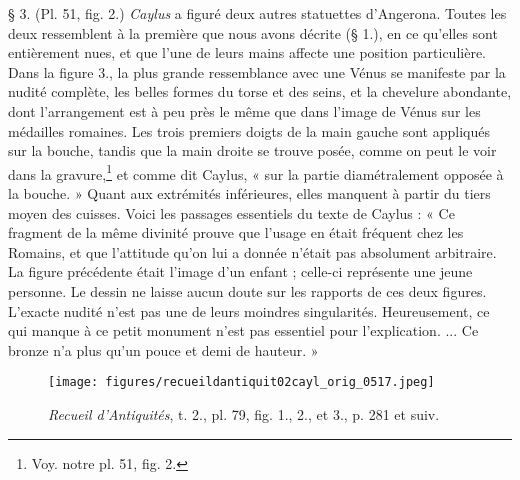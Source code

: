 \documentclass[a4paper, 11pt, oneside, polutonikogreek, french]{article}
\begin{document}
§ 3. (Pl. 51, fig. 2.) \emph{Caylus} a figuré deux autres statuettes d'Angerona. Toutes les deux ressemblent à la première que nous avons décrite (§ 1.), en ce qu'elles sont entièrement nues, et que l'une de leurs mains affecte une position particulière. Dans la figure 3., la plus grande ressemblance avec une Vénus se manifeste par la nudité complète, les belles formes du torse et des seins, et la chevelure abondante, dont l'arrangement est à peu près le même que dans l'image de Vénus sur les médailles romaines. Les trois premiers doigts de la main gauche sont appliqués sur la bouche, tandis que la main droite se trouve posée, comme on peut le voir dans la gravure,\footnote{Voy. notre pl. 51, fig. 2.} et comme dit Caylus, « sur la partie diamétralement opposée à la bouche. » Quant aux extrémités inférieures, elles manquent à partir du tiers moyen des cuisses. Voici les passages essentiels du texte de Caylus : « Ce fragment de la même divinité prouve que l'usage en était fréquent chez les Romains, et que l'attitude qu'on lui a donnée n'était pas absolument arbitraire. La figure précédente était l'image d'un enfant ; celle-ci représente une jeune personne. Le dessin ne laisse aucun doute sur les rapports de ces deux figures. L'exacte nudité n'est pas une de leurs moindres singularités. Heureusement, ce qui manque à ce petit monument n'est pas essentiel pour l'explication. ... Ce bronze n'a plus qu'un pouce et demi de hauteur. »
\clearpage
\vspace*{\fill}
\begin{figure}[H]
\centering
\texttt{[image: figures/recueildantiquit02cayl\_orig\_0517.jpeg]}
\caption{\emph{Recueil d'Antiquités}, t. 2., pl. 79, fig. 1., 2., et 3., p. 281 et suiv.}
\end{figure}
\vspace*{\fill}
\clearpage
\end{document}
